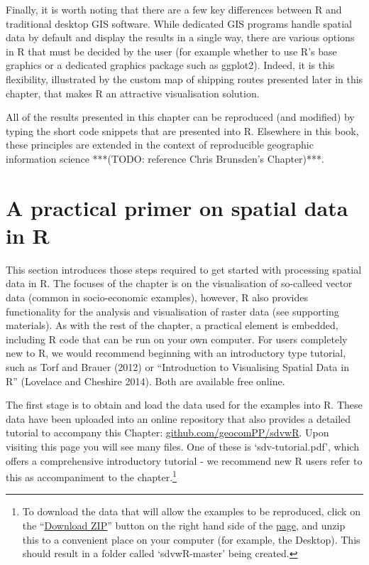 \documentclass[]{article}
\begin{document}
Finally, it is worth noting that there are a few key differences between R and
traditional desktop GIS software. While dedicated GIS programs
handle spatial data by default and display the results in a single way,
there are various options in R that must be decided by the user (for
example whether to use R's base graphics or a dedicated graphics package
such as ggplot2). Indeed, it is this flexibility, illustrated by the
custom map of shipping routes presented later in this chapter, that makes R
an attractive visualisation solution. 

All of the
results presented in this chapter can be reproduced (and modified) by typing
the short code snippets that are presented into R. Elsewhere in this book,
these principles are extended in the context of reproducible geographic
information science ***(TODO: reference Chris Brunsden's Chapter)***.

\section{A practical primer on spatial data in R}

This section introduces those steps required to get started with processing spatial data in R. The focuses of the chapter is on the visualisation of so-calleed vector data (common in socio-economic examples), however, R also provides functionality for the analysis and visualisation of raster data (see supporting materials). As with the rest of the chapter,  a practical element is embedded, including R code that can be run on your own computer. For users
completely new to R, we would recommend beginning with an introductory
type tutorial, such as Torf and Brauer (2012) or ``Introduction to Visualising Spatial Data in R'' (Lovelace and
Cheshire 2014). Both are available free online.

The first stage is to obtain and load the data used for the examples into R. These data have been uploaded into an online repository that also provides a detailed tutorial to accompany this Chapter:
\href{https://github.com/geocomPP/sdvwR/blob/master/sdv-tutorial.pdf?raw=true}{github.com/geocomPP/sdvwR}.
Upon visiting this page you will see many files. One of these is
`sdv-tutorial.pdf', which offers a comprehensive introductory tutorial -
we recommend new R users refer to this as accompaniment to the
chapter.\footnote{To
download the data that will allow the examples to be reproduced, click
on the ``\href{https://github.com/geocomPP/sdvwR/archive/master.zip}{Download ZIP}''
button on the right hand side of the 
\href{https://github.com/geocomPP/sdvwR/}{page}, 
and unzip this to a
convenient place on your computer (for example, the Desktop). This should
result in a folder called `sdvwR-master' being created.}
\end{document}
